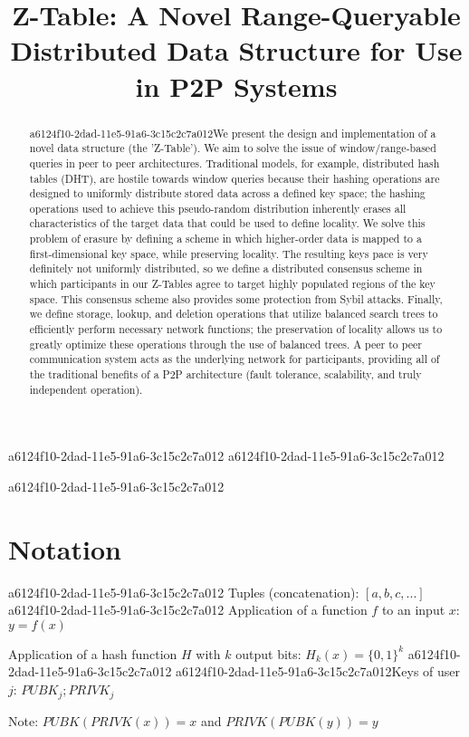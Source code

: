 \documentclass[12pt]{article}
\title{Z-Table: A Novel Range-Queryable Distributed Data Structure for Use in P2P Systems}
\begin{document}
\maketitle
a6124f10-2dad-11e5-91a6-3c15c2c7a012
a6124f10-2dad-11e5-91a6-3c15c2c7a012\begin{abstract}
a6124f10-2dad-11e5-91a6-3c15c2c7a012We present the design and implementation of a novel data structure (the 'Z-Table'). We aim to solve the issue of window/range-based queries in peer to peer architectures. Traditional models, for example,  distributed hash tables (DHT), are hostile towards window queries because their hashing operations are designed to uniformly distribute stored data across a defined key space; the hashing operations used to achieve this pseudo-random distribution inherently erases all characteristics of the target data that could be used to define locality. We solve this problem of erasure by defining a scheme in which higher-order data is mapped to a first-dimensional key space, while preserving locality. The resulting keys pace is very definitely not uniformly distributed, so we define a distributed consensus scheme in which participants in our Z-Tables agree to target highly populated regions of the key space. This consensus scheme also provides some protection from Sybil attacks. Finally, we define storage, lookup, and deletion operations that utilize balanced search trees to efficiently perform necessary network functions; the preservation of locality allows us to greatly optimize these operations through the use of balanced trees. A peer to peer communication system acts as the underlying network for participants, providing all of the traditional benefits of a P2P architecture (fault tolerance, scalability, and truly independent operation).
\end{abstract}
a6124f10-2dad-11e5-91a6-3c15c2c7a012
\section{Notation}
a6124f10-2dad-11e5-91a6-3c15c2c7a012
Tuples (concatenation): $[a,b,c,...]$
a6124f10-2dad-11e5-91a6-3c15c2c7a012
Application of a function $f$ to an input $x$: $y=f(x)$

Application of a hash function $H$ with $k$ output bits: $H_{k}(x) = \{0,1\}^k$
a6124f10-2dad-11e5-91a6-3c15c2c7a012
a6124f10-2dad-11e5-91a6-3c15c2c7a012Keys of user $j$: $ PUBK_j; PRIVK_j $

Note: $PUBK(PRIVK(x)) = x$ and $PRIVK(PUBK(y)) = y$~
\end{document}

